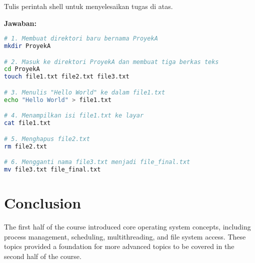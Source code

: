 \documentclass[12pt]{article}
\begin{document}
Tulis perintah shell untuk menyelesaikan tugas di atas.

\textbf{Jawaban:}

\begin{lstlisting}[language=bash]
# 1. Membuat direktori baru bernama ProyekA
mkdir ProyekA

# 2. Masuk ke direktori ProyekA dan membuat tiga berkas teks
cd ProyekA
touch file1.txt file2.txt file3.txt

# 3. Menulis "Hello World" ke dalam file1.txt
echo "Hello World" > file1.txt

# 4. Menampilkan isi file1.txt ke layar
cat file1.txt

# 5. Menghapus file2.txt
rm file2.txt

# 6. Mengganti nama file3.txt menjadi file_final.txt
mv file3.txt file_final.txt
\end{lstlisting}

\section{Conclusion}
The first half of the course introduced core operating system concepts, including process management, scheduling, multithreading, and file system access. These topics provided a foundation for more advanced topics to be covered in the second half of the course.
\end{document}
